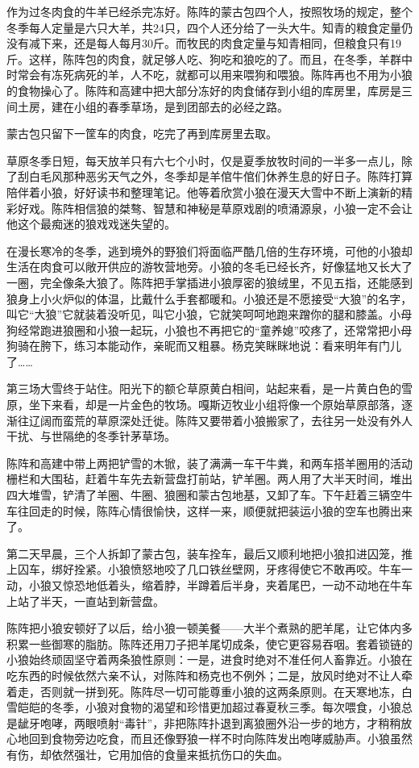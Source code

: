 \par 
\par 作为过冬肉食的牛羊已经杀完冻好。陈阵的蒙古包四个人，按照牧场的规定，整个冬季每人定量是六只大羊，共24只，四个人还分给了一头大牛。知青的粮食定量仍没有减下来，还是每人每月30斤。而牧民的肉食定量与知青相同，但粮食只有19斤。这样，陈阵包的肉食，就足够人吃、狗吃和狼吃的了。而且，在冬季，羊群中时常会有冻死病死的羊，人不吃，就都可以用来喂狗和喂狼。陈阵再也不用为小狼的食物操心了。陈阵和高建中把大部分冻好的肉食储存到小组的库房里，库房是三间土房，建在小组的春季草场，是到团部去的必经之路。
\par 蒙古包只留下一筐车的肉食，吃完了再到库房里去取。
\par 草原冬季日短，每天放羊只有六七个小时，仅是夏季放牧时间的一半多一点儿，除了刮白毛风那种恶劣天气之外，冬季却是羊倌牛倌们休养生息的好日子。陈阵打算陪伴着小狼，好好读书和整理笔记。他等着欣赏小狼在漫天大雪中不断上演新的精彩好戏。陈阵相信狼的桀骜、智慧和神秘是草原戏剧的喷涌源泉，小狼一定不会让他这个最痴迷的狼戏戏迷失望的。
\par 在漫长寒冷的冬季，逃到境外的野狼们将面临严酷几倍的生存环境，可他的小狼却生活在肉食可以敞开供应的游牧营地旁。小狼的冬毛已经长齐，好像猛地又长大了一圈，完全像条大狼了。陈阵把手掌插进小狼厚密的狼绒里，不见五指，还能感到狼身上小火炉似的体温，比戴什么手套都暖和。小狼还是不愿接受“大狼”的名字，叫它“大狼”它就装着没听见，叫它小狼，它就笑呵呵地跑来蹭你的腿和膝盖。小母狗经常跑进狼圈和小狼一起玩，小狼也不再把它的“童养媳”咬疼了，还常常把小母狗骑在胯下，练习本能动作，亲昵而又粗暴。杨克笑眯眯地说：看来明年有门儿了……
\par 第三场大雪终于站住。阳光下的额仑草原黄白相间，站起来看，是一片黄白色的雪原，坐下来看，却是一片金色的牧场。嘎斯迈牧业小组将像一个原始草原部落，逐渐往辽阔而蛮荒的草原深处迁徙。陈阵又要带着小狼搬家了，去往另一处没有外人干扰、与世隔绝的冬季针茅草场。
\par 
\par 陈阵和高建中带上两把铲雪的木锨，装了满满一车干牛粪，和两车搭羊圈用的活动栅栏和大围毡，赶着牛车先去新营盘打前站，铲羊圈。两人用了大半天时间，堆出四大堆雪，铲清了羊圈、牛圈、狼圈和蒙古包地基，又卸了车。下午赶着三辆空牛车往回走的时候，陈阵心情很愉快，这样一来，顺便就把装运小狼的空车也腾出来了。
\par 第二天早晨，三个人拆卸了蒙古包，装车拴车，最后又顺利地把小狼扣进囚笼，推上囚车，绑好拴紧。小狼愤怒地咬了几口铁丝壁网，牙疼得使它不敢再咬。牛车一动，小狼又惊恐地低着头，缩着脖，半蹲着后半身，夹着尾巴，一动不动地在牛车上站了半天，一直站到新营盘。
\par 陈阵把小狼安顿好了以后，给小狼一顿美餐——大半个煮熟的肥羊尾，让它体内多积累一些御寒的脂肪。陈阵还用刀子把羊尾切成条，使它更容易吞咽。套着锁链的小狼始终顽固坚守着两条狼性原则：一是，进食时绝对不准任何人畜靠近。小狼在吃东西的时候依然六亲不认，对陈阵和杨克也不例外；二是，放风时绝对不让人牵着走，否则就一拼到死。陈阵尽一切可能尊重小狼的这两条原则。在天寒地冻，白雪皑皑的冬季，小狼对食物的渴望和珍惜更加超过春夏秋三季。每次喂食，小狼总是龇牙咆哮，两眼喷射“毒针”，非把陈阵扑退到离狼圈外沿一步的地方，才稍稍放心地回到食物旁边吃食，而且还像野狼一样不时向陈阵发出咆哮威胁声。小狼虽然有伤，却依然强壮，它用加倍的食量来抵抗伤口的失血。

